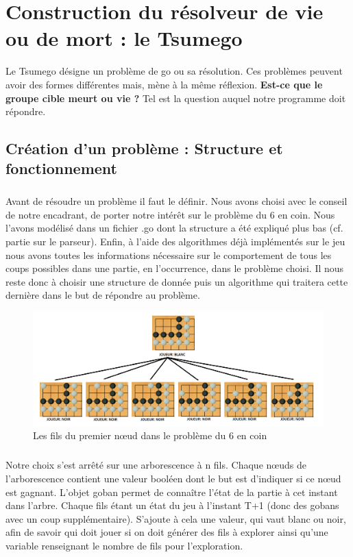 \chapter{Construction du résolveur de vie ou de mort : le Tsumego}\label{chap:tsumego}
    Le Tsumego désigne un problème de go ou sa résolution. Ces problèmes peuvent avoir des formes différentes mais, mène à la même réflexion. \textbf{Est-ce que le groupe cible meurt ou vie ?}
    Tel est la question auquel notre programme doit répondre.

    \section{Création d'un problème : Structure et fonctionnement}
        \paragraph{}Avant de résoudre un problème il faut le définir. Nous avons choisi avec le conseil de notre encadrant, de porter notre intérêt sur le problème du 6 en coin. Nous l’avons modélisé dans un fichier .go dont la structure a été expliqué plus bas (cf. partie sur le parseur).
        Enfin, à l’aide des algorithmes déjà implémentés sur le jeu nous avons toutes les informations nécessaire sur le comportement de tous les coups possibles dans une partie, en l'occurrence, dans le problème choisi. Il nous reste donc à choisir une structure de donnée puis un algorithme qui traitera cette dernière dans le but de répondre au problème.
        
        \begin{figure}[h!]
        \centering
        \includegraphics[scale=0.35]{figures/experiments/1.png}
        \caption{Les fils du premier n\oe ud dans le problème du 6 en coin}
        \label{fig:game}
        \end{figure}

        \paragraph{}Notre choix s’est arrêté sur une arborescence à n fils. Chaque nœuds de l’arborescence contient une valeur booléen dont le but est d’indiquer si ce nœud est gagnant.
        L'objet goban permet de connaître l’état de la partie à cet instant dans l’arbre. Chaque fils étant un état du jeu à l’instant T+1 (donc des gobans avec un coup supplémentaire). S’ajoute à cela une valeur, qui vaut blanc ou noir, afin de savoir qui doit jouer si on doit générer des fils à explorer ainsi qu'une variable renseignant le nombre de fils pour l'exploration.


